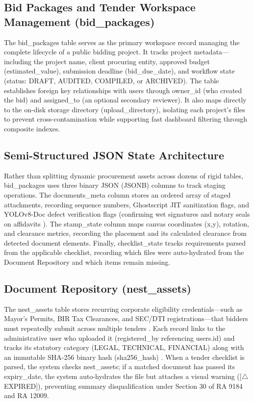 \subsection{Bid Packages and Tender Workspace Management (bid\_packages)}
The bid\_packages table serves as the primary workspace record managing the complete lifecycle of a public bidding project.
It tracks project metadata---including the project name, client procuring entity, approved budget (estimated\_value), submission deadline (bid\_due\_date), and workflow state (status: DRAFT, AUDITED, COMPILED, or ARCHIVED).
The table establishes foreign key relationships with users through owner\_id (who created the bid) and assigned\_to (an optional secondary reviewer).
It also maps directly to the on-disk storage directory (upload\_directory), isolating each project's files to prevent cross-contamination while supporting fast dashboard filtering through composite indexes.

\subsection{Semi-Structured JSON State Architecture}
Rather than splitting dynamic procurement assets across dozens of rigid tables, bid\_packages uses three binary JSON (JSONB) columns to track staging operations.
The documents\_meta column stores an ordered array of staged attachments, recording sequence numbers, Ghostscript JIT sanitization flags, and YOLOv8-Doc defect verification flags (confirming wet signatures and notary seals on affidavits \cite{ref1, ref46}).
The stamp\_state column maps canvas coordinates (x,y), rotation, and clearance metrics, recording the placement and its calculated clearance from detected document elements.
Finally, checklist\_state tracks requirements parsed from the applicable checklist, recording which files were auto-hydrated from the Document Repository and which items remain missing.

\subsection{Document Repository (nest\_assets)}
The nest\_assets table stores recurring corporate eligibility credentials---such as Mayor's Permits, BIR Tax Clearances, and SEC/DTI registrations---that bidders must repeatedly submit across multiple tenders \cite{ref1, ref46}.
Each record links to the administrative user who uploaded it (registered\_by referencing users.id) and tracks its statutory category (LEGAL, TECHNICAL, FINANCIAL) along with an immutable SHA-256 binary hash (sha256\_hash) \cite{ref43}.
When a tender checklist is parsed, the system checks nest\_assets; if a matched document has passed its expiry\_date, the system auto-hydrates the file but attaches a visual warning ([\ensuremath{\triangle} EXPIRED]), preventing summary disqualification under Section 30 of RA 9184 and RA 12009.

